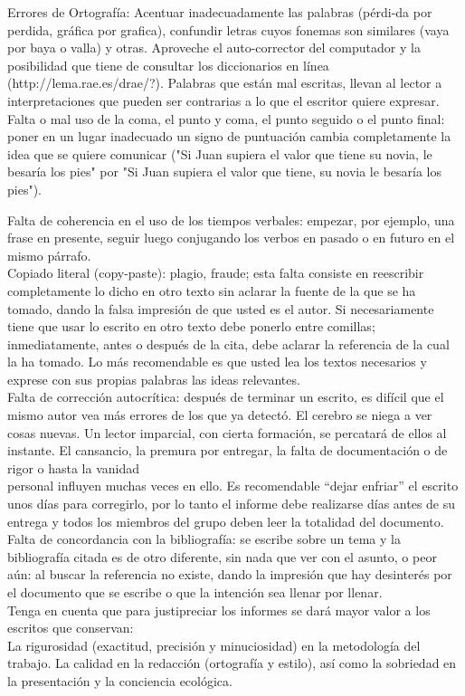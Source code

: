 Errores de Ortografía: Acentuar inadecuadamente las palabras (pérdi-da por perdida, gráfica por grafica), confundir letras cuyos fonemas son similares (vaya por baya o valla) y otras. Aproveche el auto-corrector del computador y la posibilidad que tiene de consultar los diccionarios en línea (http://lema.rae.es/drae/?). Palabras que están mal escritas, llevan al lector a interpretaciones que pueden ser contrarias a lo que el escritor quiere expresar.\\

Falta o mal uso de la coma, el punto y coma, el punto seguido o el punto final: poner en un lugar inadecuado un signo de puntuación cambia completamente la idea que se quiere comunicar ("Si Juan supiera el valor que tiene su novia, le besaría los pies" por "Si Juan supiera el valor que tiene, su novia le besaría los pies").

Falta de coherencia en el uso de los tiempos verbales: empezar, por ejemplo, una frase en presente, seguir luego conjugando los verbos en pasado o en futuro en el mismo párrafo.\\

Copiado literal (copy-paste): plagio, fraude; esta falta consiste en reescribir completamente lo dicho en otro texto sin aclarar la fuente de la que se ha tomado, dando la falsa impresión de que usted es el autor. Si necesariamente tiene que usar lo escrito en otro texto debe ponerlo entre comillas; inmediatamente, antes o después de la cita, debe aclarar la referencia de la cual la ha tomado. Lo más recomendable es que usted lea los textos necesarios y exprese con sus propias palabras las ideas relevantes.\\

Falta de corrección autocrítica: después de terminar un escrito, es difícil que el mismo autor vea más errores de los que ya detectó. El cerebro se niega a ver cosas nuevas. Un lector imparcial, con cierta formación, se percatará de ellos al instante. El cansancio, la premura por entregar, la falta de documentación o de rigor o hasta la vanidad\\

personal influyen muchas veces en ello. Es recomendable “dejar enfriar” el escrito unos días para corregirlo, por lo tanto el informe debe realizarse días antes de su entrega y todos los miembros del grupo deben leer la totalidad del documento.\\

Falta de concordancia con la bibliografía: se escribe sobre un tema y la bibliografía citada es de otro diferente, sin nada que ver con el asunto, o peor aún: al buscar la referencia no existe, dando la impresión que hay desinterés por el documento que se escribe o que la intención sea llenar por llenar.\\

Tenga en cuenta que para justipreciar los informes se dará mayor valor a los escritos que conservan:\\

La rigurosidad (exactitud, precisión y minuciosidad) en la metodología del trabajo. La calidad en la redacción (ortografía y estilo), así como la sobriedad en la presentación y la conciencia ecológica.


